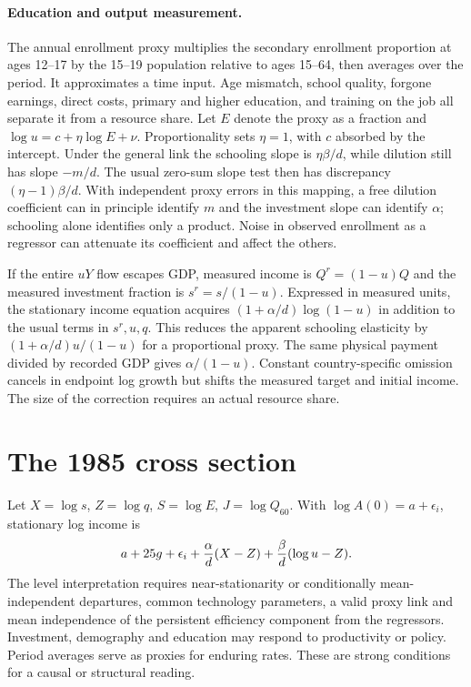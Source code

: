 \documentclass[11pt]{article}
\begin{document}
\paragraph{Education and output measurement.}
The annual enrollment proxy multiplies the secondary enrollment proportion at ages 12--17 by the 15--19 population relative to ages 15--64, then averages over the period. It approximates a time input. Age mismatch, school quality, forgone earnings, direct costs, primary and higher education, and training on the job all separate it from a resource share. Let $E$ denote the proxy as a fraction and $\log u=c+\eta\log E+\nu$. Proportionality sets $\eta=1$, with $c$ absorbed by the intercept. Under the general link the schooling slope is $\eta\beta/d$, while dilution still has slope $-m/d$. The usual zero-sum slope test then has discrepancy $(\eta-1)\beta/d$. With independent proxy errors in this mapping, a free dilution coefficient can in principle identify $m$ and the investment slope can identify $\alpha$; schooling alone identifies only a product. Noise in observed enrollment as a regressor can attenuate its coefficient and affect the others.

If the entire $uY$ flow escapes GDP, measured income is $Q^r=(1-u)Q$ and the measured investment fraction is $s^r=s/(1-u)$. Expressed in measured units, the stationary income equation acquires $(1+\alpha/d)\log(1-u)$ in addition to the usual terms in $s^r,u,q$. This reduces the apparent schooling elasticity by $(1+\alpha/d)u/(1-u)$ for a proportional proxy. The same physical payment divided by recorded GDP gives $\alpha/(1-u)$. Constant country-specific omission cancels in endpoint log growth but shifts the measured target and initial income. The size of the correction requires an actual resource share.

\section{The 1985 cross section}
Let $X=\log s$, $Z=\log q$, $S=\log E$, $J=\log Q_{60}$. With $\log A(0)=a+\epsilon_i$, stationary log income is
\[
 a+25g+\epsilon_i+{\alpha\over d}(X-Z)+{\beta\over d}(\log u-Z).
\]
The level interpretation requires near-stationarity or conditionally mean-independent departures, common technology parameters, a valid proxy link and mean independence of the persistent efficiency component from the regressors. Investment, demography and education may respond to productivity or policy. Period averages serve as proxies for enduring rates. These are strong conditions for a causal or structural reading.
\end{document}
